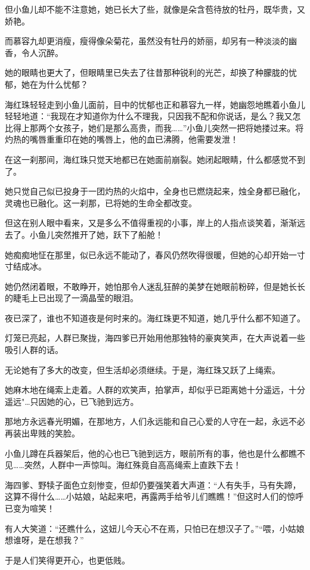 \documentclass[12pt,oneside]{book}
\begin{document}
但小鱼儿却不能不注意她，她已长大了些，就像是朵含苞待放的牡丹，既华贵，又娇艳。

而慕容九却更消瘦，瘦得像朵菊花，虽然没有牡丹的娇丽，却另有一种淡淡的幽香，令人沉醉。

她的眼睛也更大了，但眼睛里已失去了往昔那种锐利的光芒，却换了种朦胧的忧郁，她在为什么忧郁？

海红珠轻轻走到小鱼儿面前，目中的忧郁也正和慕容九一样，她幽怨地瞧着小鱼儿轻轻地道：``我现在才知道你为什么不理我，只因我不配和你说话，是么？我又怎比得上那两个女孩子，她们是那么高贵，而我\ldots\ldots{}''小鱼儿突然一把将她搂过来。将灼热的嘴唇重重印在她的嘴唇上，他的血已沸腾，他需要发泄！

在这一刹那间，海红珠只觉天地都已在她面前崩裂。她闭起眼睛，什么都感觉不到了。

她只觉自己似已投身于一团灼热的火焰中，全身也已燃烧起来，烛全身都已融化，灵魂也已融化。这一刹那，已将她的生命全都改变。

但这在别人眼中看来，又是多么不值得重视的小事，岸上的人指点谈笑着，渐渐远去了。小鱼儿突然推开了她，跃下了船舱！

她痴痴地怔在那里，似已永远不能动了，春风仍然吹得很暖，但她的心却开始一寸寸结成冰。

她仍然闭着眼，不敢睁开，她怕那令人迷乱狂醉的美梦在她眼前粉碎，但是她长长的睫毛上已出现了一滴晶莹的眼泪。

夜已深了，谁也不知道夜是何时来的。海红珠更不知道，她几乎什么都不知道了。

灯笼已亮起，人群已聚拢，海四爹已开始用他那独特的豪爽笑声，在大声说着一些吸引人群的话。

无论她有了多大的改变，但生活却必须继续。于是，海红珠又跃了上绳索。

她麻木地在绳索上走着。人群的欢笑声，拍掌声，却似乎已距离她十分遥远，十分遥远"\ldots 只因她的心，已飞驰到远方。

那地方永远春光明媚，在那地方，人们永远能和自己心爱的人守在一起，永远不必再装出卑贱的笑脸。

小鱼儿蹲在兵器架后，他的心也已飞驰到远方，眼前所有的事，他也是什么都瞧不见\ldots\ldots 突然，人群中一声惊叫。海红殊竟自高高绳索上直跌下去！

海四爹、野犊子面色立刻惨变，但却仍要强笑着大声道：``人有失手，马有失蹄，这算不得什么\ldots\ldots 小姑娘，站起来吧，再露两手给爷儿们瞧瞧！''但这时人们的惊呼已变为喧笑！

有人大笑道：``还瞧什么，这妞儿今天心不在焉，只怕已在想汉子了。''``喂，小姑娘想谁呀，是在想我？''

于是人们笑得更开心，也更低贱。
\end{document}

